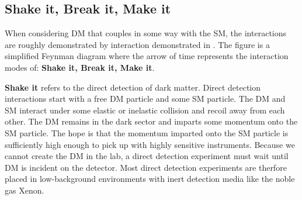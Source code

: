 \subsection{Shake it, Break it, Make it\label{sec:bop_it}}

\begin{figure}[h]
\end{figure}

When considering DM that couples in some way with the SM, the interactions are roughly demonstrated by interaction demonstrated in .
The figure is a simplified Feynman diagram where the arrow of time represents the interaction modes of: \textbf{Shake it, Break it, Make it}.

\textbf{Shake it} refers to the direct detection of dark matter.
Direct detection interactions start with a free DM particle and some SM particle.
The DM and SM interact under some elastic or inelastic collision and recoil away from each other.
The DM remains in the dark sector and imparts some momentum onto the SM particle.
The hope is that the momentum imparted onto the SM particle is sufficiently high enough to pick up with highly sensitive instruments.
Because we cannot create the DM in the lab, a direct detection experiment must wait until DM is incident on the detector.
Most direct detection experiments are therfore placed in low-background environments with inert detection media like the noble gas Xenon. \cite{Cooley:dd_dm}

